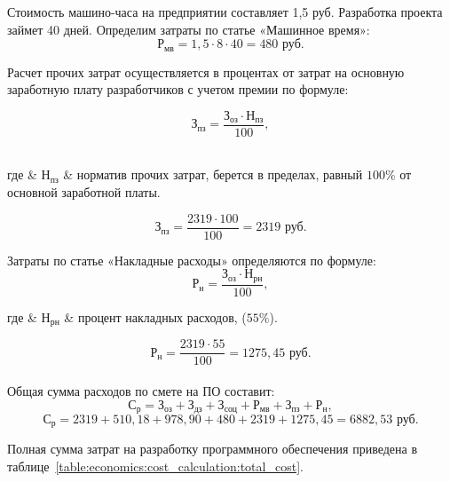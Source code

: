 Стоимость машино-часа на предприятии составляет 1,5 руб. Разработка проекта займет 40 дней. Определим затраты по
статье «Машинное время»:
\begin{equation*}
  \text{Р}_\text{мв} = 1,5 \cdot 8 \cdot 40 = 480 \text{ руб.}
\end{equation*}

Расчет прочих затрат осуществляется в процентах от затрат на основную заработную плату разработчиков с учетом
премии по формуле:

\begin{equation}
  \text{З}_\text{пз} = \frac{\text{З}_\text{оз} \cdot \text{Н}_\text{пз}}{100},
\end{equation}
\\[0pt]
\begin{explanation}
  где & $ \text{Н}_\text{пз} $ & норматив прочих затрат, берется в пределах, равный $100\%$ от основной заработной платы.
\end{explanation}

\begin{equation*}
  \text{З}_\text{пз} = \frac{2319 \cdot 100}{100} = 2319 \text{ руб.}
\end{equation*}
\setlength{\parskip}{0pt}

Затраты по статье «Накладные расходы» определяются по формуле:
\begin{equation}
  \text{Р}_\text{н} = \frac{\text{З}_\text{оз} \cdot \text{Н}_\text{рн}}{100},
\end{equation}
\begin{explanation}
  где & $ \text{Н}_\text{рн} $ & процент накладных расходов, ($55\%$).
\end{explanation}
\begin{equation*}
  \text{Р}_\text{н} = \frac{2319 \cdot 55}{100} = 1275,45 \text{ руб.}
\end{equation*}\\[0pt]

Общая сумма расходов по смете на ПО составит:
\begin{equation}
	\text{С}_\text{р} = \text{З}_\text{оз} + \text{З}_\text{дз} + \text{З}_\text{соц} + \text{Р}_\text{мв} + \text{З}_\text{пз} + \text{Р}_\text{н},
\end{equation}
\begin{equation*}
	\text{С}_\text{р} = 2319 + 510,18 + 978,90 + 480 + 2319 + 1275,45 = 6882,53 \text{ руб.}
\end{equation*}

Полная сумма затрат на разработку программного обеспечения приведена в таблице~\ref{table:economics:cost_calculation:total_cost}.

